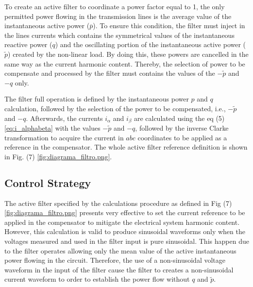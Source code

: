To create an active filter to coordinate a power factor equal to 1, the only permitted power flowing in the transmission lines is the average value of the instantaneous active power ($\overline{p}$). To ensure this condition, the filter must inject in the lines currents which contains the symmetrical values of the instantaneous reactive power ($q$) and the oscillating portion of the instantaneous active power ($\tilde{p}$) created by the non-linear load. By doing this, these powers are cancelled in the same way as the current harmonic content. Thereby, the selection of power to be compensate and processed by the filter must contains the values of the $-\tilde{p}$ and $-q$ only.

The filter full operation is defined by the instantaneous power $p$ and $q$ calculation, followed by the selection of the power to be compensated, i.e., $-\tilde{p}$ and $-q$. Afterwards, the currents $i_{\alpha}$ and $i_{\beta}$ are calculated using the eq (5) \ref{eq:i_alphabeta} with the values $-\tilde{p}$ and $-q$, followed by the inverse Clarke transformation to acquire the current in $abc$ coordinates to be applied as a reference in the compensator. The whole active filter reference definition is shown in Fig. (7) \ref{fig:diagrama_filtro.png}.


\subsection{Control Strategy}

The active filter specified by the calculations procedure as defined in Fig (7) \ref{fig:diagrama_filtro.png} presents very effective to set the current reference to be applied in the compensator to mitigate the electrical system harmonic content. However, this calculation is valid to produce sinusoidal waveforms only when the voltages measured and used in the filter input is pure sinusoidal. This happen due to the filter operates allowing only the mean value of the active instantaneous power flowing in the circuit. Therefore, the use of a non-sinusoidal voltage waveform in the input of the filter cause the filter to creates a non-sinusoidal current waveform to order to establish the power flow without $q$ and $\tilde{p}$.

